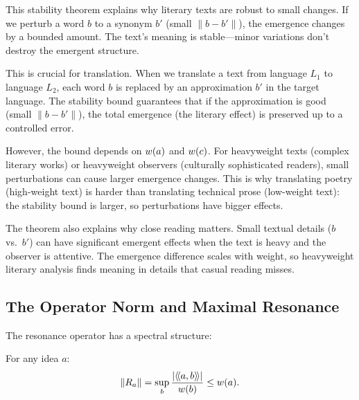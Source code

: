 \begin{interpretation}
This stability theorem explains why literary texts are robust to small changes.
If we perturb a word $b$ to a synonym $b'$ (small $\|b - b'\|$), the emergence
changes by a bounded amount. The text's meaning is stable---minor variations
don't destroy the emergent structure.

This is crucial for translation. When we translate a text from language $L_1$
to language $L_2$, each word $b$ is replaced by an approximation $b'$ in the
target language. The stability bound guarantees that if the approximation is
good (small $\|b - b'\|$), the total emergence (the literary effect) is preserved
up to a controlled error.

However, the bound depends on $w(a)$ and $w(c)$. For heavyweight
texts (complex literary works) or heavyweight observers (culturally sophisticated
readers), small perturbations can cause larger emergence changes. This is why
translating poetry (high-weight text) is harder than translating technical
prose (low-weight text): the stability bound is larger, so perturbations have
bigger effects.

The theorem also explains why close reading matters. Small textual details
($b$ vs.\ $b'$) can have significant emergent effects when the text is heavy
and the observer is attentive. The emergence difference scales with weight, so
heavyweight literary analysis finds meaning in details that casual reading misses.
\end{interpretation}

\subsection{The Operator Norm and Maximal Resonance}

The resonance operator has a spectral structure:

\begin{theorem}
\label{thm:operator-norm-spectral}
For any idea $a$:
\[
  \|R_a\| = \sup_{b} \frac{|\langle\!\langle a, b \rangle\!\rangle|}{w(b)} \leq w(a).
\]
\end{theorem}

